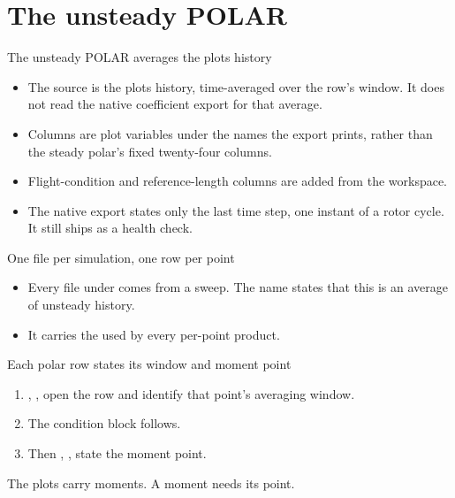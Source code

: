 %
\section{The unsteady POLAR}

\begin{frame}{The unsteady POLAR averages the plots history}
\begin{itemize}\small
  \item The source is the plots history, time-averaged over the row's window.
        It does not read the native coefficient export for that average.
  \item Columns are plot variables under the names the export prints,
        rather than the steady polar's fixed twenty-four columns.
  \item Flight-condition and reference-length columns are added from the workspace.
  \item The native export states only the last time step, one instant of a
        rotor cycle. It still ships as a health check.
\end{itemize}
\end{frame}

\begin{frame}{One file per simulation, one row per point}
\small {}
\begin{itemize}
  \item Every file under  comes from a sweep.
        The name states that this is an average of unsteady history.
  \item It carries the  used by every per-point product.
\end{itemize}
\end{frame}

\begin{frame}{Each polar row states its window and moment point}
\begin{enumerate}
  \item {}, ,  open the row
        and identify that point's averaging window.
  \item The condition block follows.
  \item Then , ,  state the moment point.
\end{enumerate}
\begin{takeaway}
The plots carry moments. A moment needs its point.
\end{takeaway}
\end{frame}


